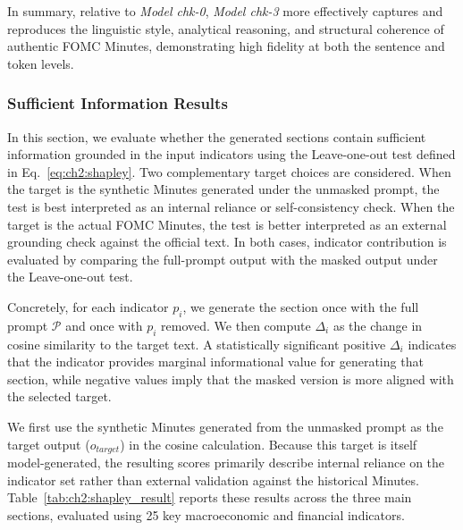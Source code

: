 In summary, relative to \textit{Model chk-0}, \textit{Model chk-3} more effectively captures and reproduces the linguistic style, analytical reasoning, and structural coherence of authentic FOMC Minutes, demonstrating high fidelity at both the sentence and token levels.




\subsubsection*{Sufficient Information Results}

In this section, we evaluate whether the generated sections contain sufficient information grounded in the input indicators using the Leave-one-out test defined in Eq.~\ref{eq:ch2:shapley}. Two complementary target choices are considered. When the target is the synthetic Minutes generated under the unmasked prompt, the test is best interpreted as an internal reliance or self-consistency check. When the target is the actual FOMC Minutes, the test is better interpreted as an external grounding check against the official text. In both cases, indicator contribution is evaluated by comparing the full-prompt output with the masked output under the Leave-one-out test.



Concretely, for each indicator $p_i$, we generate the section once with the full prompt $\mathcal{P}$ and once with $p_i$ removed. We then compute $\Delta_i$ as the change in cosine similarity to the target text. A statistically significant positive $\Delta_i$ indicates that the indicator provides marginal informational value for generating that section, while negative values imply that the masked version is more aligned with the selected target.

We first use the synthetic Minutes generated from the unmasked prompt as the target output ($o_{target}$) in the cosine calculation. Because this target is itself model-generated, the resulting scores primarily describe internal reliance on the indicator set rather than external validation against the historical Minutes. Table~\ref{tab:ch2:shapley_result} reports these results across the three main sections, evaluated using 25 key macroeconomic and financial indicators.

